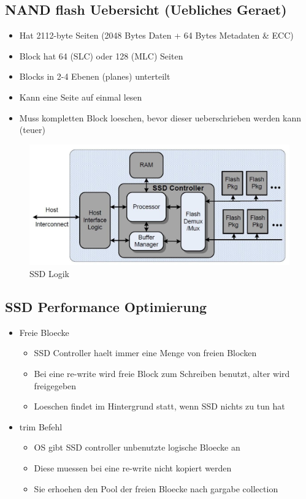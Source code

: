 \documentclass[a4paper]{scrreprt}
\begin{document}
\subsection{NAND flash Uebersicht (Uebliches Geraet)}
\begin{itemize}
	\item Hat 2112-byte Seiten (2048 Bytes Daten + 64 Bytes Metadaten \& ECC)
	\item Block hat 64 (SLC) oder 128 (MLC) Seiten
	\item Blocks in 2-4 Ebenen (planes) unterteilt
	\item Kann eine Seite auf einmal lesen
	\item Muss kompletten Block loeschen, bevor dieser ueberschrieben werden kann (teuer)
\end{itemize}

\begin{figure}[ht]
\centering
\includegraphics[scale=0.3]{graphics/ssd.png}
\caption{SSD Logik}
\end{figure}

\subsection{SSD Performance Optimierung}
\begin{itemize}
	\item Freie Bloecke
		\begin{itemize}
			\item SSD Controller haelt immer eine Menge von freien Blocken
			\item Bei eine re-write wird freie Block zum Schreiben benutzt, alter wird freigegeben
			\item Loeschen findet im Hintergrund statt, wenn SSD nichts zu tun hat
		\end{itemize}
	\item trim Befehl
		\begin{itemize}
			\item OS gibt SSD controller unbenutzte logische Bloecke an
			\item Diese muessen bei eine re-write nicht kopiert werden
			\item Sie erhoehen den Pool der freien Bloecke nach gargabe collection
		\end{itemize}
\end{itemize}
\end{document}
